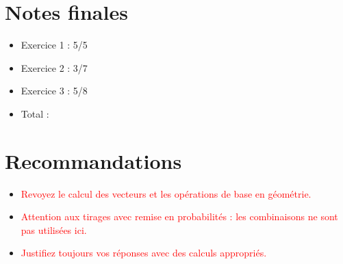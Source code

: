 \documentclass{article}
\begin{document}
\section*{Notes finales}
\begin{itemize}
\item Exercice 1 : 5/5
\item Exercice 2 : 3/7
\item Exercice 3 : 5/8
\item Total : 
\end{itemize}

\section*{Recommandations}
\begin{itemize}
\item \textcolor{red}{Revoyez le calcul des vecteurs et les opérations de base en géométrie.}
\item \textcolor{red}{Attention aux tirages avec remise en probabilités : les combinaisons ne sont pas utilisées ici.}
\item \textcolor{red}{Justifiez toujours vos réponses avec des calculs appropriés.}
\end{itemize}
\end{document}
